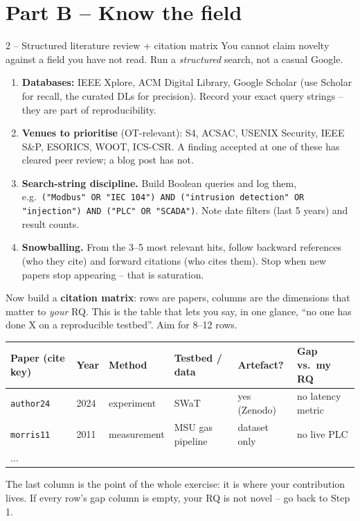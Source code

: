 \documentclass[11pt,a4paper]{article}
\begin{document}
\section*{Part B -- Know the field}

\begin{stepbox}{2 -- Structured literature review + citation matrix}
You cannot claim novelty against a field you have not read. Run a \emph{structured} search, not a casual Google.
\begin{enumerate}\setlength{\itemsep}{2pt}
  \item \textbf{Databases:} IEEE Xplore, ACM Digital Library, Google Scholar (use Scholar for recall, the curated DLs for precision). Record your exact query strings -- they are part of reproducibility.
  \item \textbf{Venues to prioritise} (OT-relevant): S4, ACSAC, USENIX Security, IEEE S\&P, ESORICS, WOOT, ICS-CSR. A finding accepted at one of these has cleared peer review; a blog post has not.
  \item \textbf{Search-string discipline.} Build Boolean queries and log them, e.g.\ \texttt{("Modbus" OR "IEC 104") AND ("intrusion detection" OR "injection") AND ("PLC" OR "SCADA")}. Note date filters (last 5 years) and result counts.
  \item \textbf{Snowballing.} From the 3--5 most relevant hits, follow backward references (who they cite) and forward citations (who cites them). Stop when new papers stop appearing -- that is saturation.
\end{enumerate}

Now build a \textbf{citation matrix}: rows are papers, columns are the dimensions that matter to \emph{your} RQ. This is the table that lets you say, in one glance, ``no one has done X on a reproducible testbed''. Aim for 8--12 rows.

\vspace{1mm}
{\footnotesize
\begin{tabular}{@{}p{3.0cm}p{1.0cm}p{2.4cm}p{2.4cm}p{1.6cm}p{2.6cm}@{}}
\toprule
\textbf{Paper (cite key)} & \textbf{Year} & \textbf{Method} & \textbf{Testbed / data} & \textbf{Artefact?} & \textbf{Gap vs.\ my RQ} \\
\midrule
\texttt{author24} & 2024 & experiment & SWaT & yes (Zenodo) & no latency metric \\
\texttt{morris11} & 2011 & measurement & MSU gas pipeline & dataset only & no live PLC \\
$\dots$ & & & & & \\
\bottomrule
\end{tabular}}

\vspace{1mm}
The last column is the point of the whole exercise: it is where your contribution lives. If every row's gap column is empty, your RQ is not novel -- go back to Step 1.
\end{stepbox}
\end{document}
